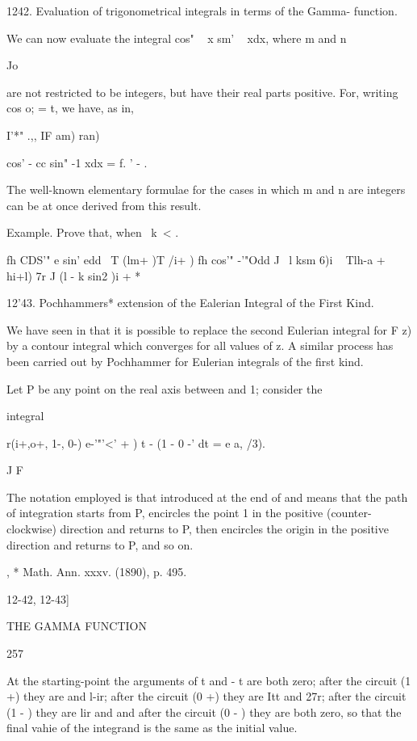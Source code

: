 
1242. Evaluation of trigonometrical integrals in terms of the Gamma-
function.

We can now evaluate the integral cos" ~ x sm' ~ xdx, where m and n

Jo

are not restricted to be integers, but have their real parts positive.
For, writing cos o; = t, we have, as in,

I'*" .,, IF am) ran)

cos' - cc sin" -1 xdx = f. ' - .

The well-known elementary formulae for the cases in which m and n are
integers can be at once derived from this result.

Example. Prove that, when \ k\ < .\,

fh CDS'" e sin' edd \ T (lm+ )T /i+ ) fh cos'" -'"Odd J \ l ksm 6)i ~
Tlh-a + hi+l) 7r J (l - k sin2 )i + *


12'43. Pochhammers* extension of the Ealerian Integral of the First
Kind.

We have seen in that it is possible to replace the second
Eulerian integral for F z) by a contour integral which converges for
all values of z. A similar process has been carried out by Pochhammer
for Eulerian integrals of the first kind.

Let P be any point on the real axis between and 1; consider the

integral

r(i+,o+, 1-, 0-) e-'"'<' + ) t - (1 - 0 -' dt = e a, /3).

J F

The notation employed is that introduced at the end of and
means that the path of integration starts from P, encircles the point
1 in the positive (counter-clockwise) direction and returns to P, then
encircles the origin in the positive direction and returns to P, and
so on.

, * Math. Ann. xxxv. (1890), p. 495.

12-42, 12-43]

THE GAMMA FUNCTION

257

At the starting-point the arguments of t and - t are both zero; after
the circuit (1 +) they are and l-ir; after the circuit (0 +) they are
Itt and 27r; after the circuit (1 - ) they are lir and and after the
circuit (0 - ) they are both zero, so that the final vahie of the
integrand is the same as the initial value.

